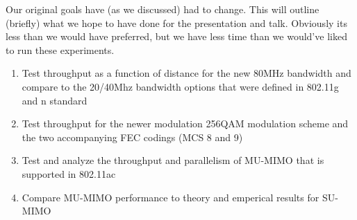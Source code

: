 

Our original goals have (as we discussed) had to change. This will outline (briefly) what we hope to have done for the presentation and talk.
Obviously its less than we would have preferred, but we have less time than we would've liked to run these experiments.

\begin{enumerate}
\item Test throughput as a function of distance for the new 80MHz bandwidth and compare to the 20/40Mhz bandwidth options that were defined in 802.11g and n standard
\item Test throughput for the newer modulation 256QAM modulation scheme and the two accompanying FEC codings (MCS 8 and 9)
\item Test and analyze the throughput and parallelism of MU-MIMO that is supported in 802.11ac
\item Compare MU-MIMO performance to theory and emperical results for SU-MIMO
\end{enumerate}
